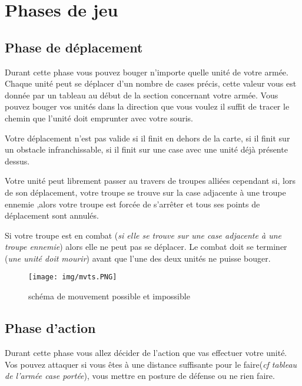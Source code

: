 \documentclass[a4paper]{article}
\begin{document}
\newpage
\section{Phases de jeu}

	\subsection{Phase de déplacement}

	\quad Durant cette phase vous pouvez bouger n'importe quelle unité de votre armée. Chaque unité peut se déplacer d'un nombre de cases précis, cette valeur vous est donnée par un tableau au début de la section concernant votre armée. Vous pouvez bouger vos unités dans la direction que vous voulez il suffit de tracer le chemin que l'unité doit emprunter avec votre souris.

	\hspace{.3cm}

	\quad Votre déplacement n'est pas valide si il finit en dehors de la carte, si il finit sur un obstacle infranchissable, si il finit sur une case avec une unité déjà présente dessus.

	\quad Votre unité peut librement passer au travers de troupes alliées cependant si, lors de son déplacement, votre troupe se trouve sur la case adjacente à une troupe ennemie ,alors votre troupe est forcée de s'arrêter et tous ses points de déplacement sont annulés.

	\quad Si votre troupe est en combat (\textit{si elle se trouve sur une case adjacente à une troupe ennemie}) alors elle ne peut pas se déplacer. Le combat doit se terminer (\textit{une unité doit mourir}) avant que l'une des deux unités ne puisse bouger.

	\begin{figure}[h]
		\center
		\texttt{[image: img/mvts.PNG]}
		\caption{schéma de mouvement possible et impossible}
	\end{figure}

	\newpage
\subsection{Phase d'action}

	\quad Durant cette phase vous allez décider de l'action que vas effectuer votre unité. Vos pouvez attaquer si vous êtes à une distance suffisante pour le faire(\textit{cf tableau de l'armée case portée}), vous mettre en posture de défense ou ne rien faire.
	
\end{document}
